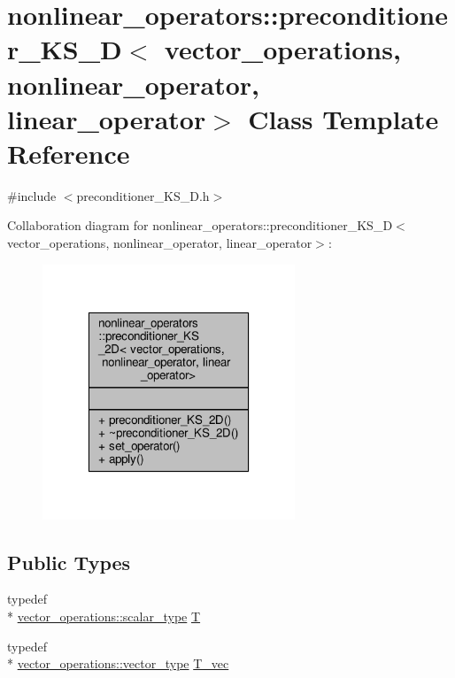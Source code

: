 \hypertarget{classnonlinear__operators_1_1preconditioner__KS__2D}{\section{nonlinear\-\_\-operators\-:\-:preconditioner\-\_\-\-K\-S\-\_\-D$<$ vector\-\_\-operations, nonlinear\-\_\-operator, linear\-\_\-operator$>$ Class Template Reference}
\label{classnonlinear__operators_1_1preconditioner__KS__2D}
}


{\ttfamily \#include $<$preconditioner\-\_\-\-K\-S\-\_\-D.\-h$>$}



Collaboration diagram for nonlinear\-\_\-operators\-:\-:preconditioner\-\_\-\-K\-S\-\_\-D$<$ vector\-\_\-operations, nonlinear\-\_\-operator, linear\-\_\-operator$>$\-:\nopagebreak
\begin{figure}[H]
\begin{center}
\leavevmode
\includegraphics[width=214pt]{classnonlinear__operators_1_1preconditioner__KS__2D__coll__graph}
\end{center}
\end{figure}
\subsection*{Public Types}
\begin{DoxyCompactItemize}
\item 
typedef \\*
\hyperlink{structcpu__vector__operations_aca6b216aa1fb172df83d98350e94fd61}{vector\-\_\-operations\-::scalar\-\_\-type} \hyperlink{classnonlinear__operators_1_1preconditioner__KS__2D_abdcb08394518180c04171faec737cd43}{T}
\item 
typedef \\*
\hyperlink{structcpu__vector__operations_a1962836df596ce262704d208e9a6d8f9}{vector\-\_\-operations\-::vector\-\_\-type} \hyperlink{classnonlinear__operators_1_1preconditioner__KS__2D_ac8a7bc16e8f8296371167534fe482263}{T\-\_\-vec}
\end{DoxyCompactItemize}
